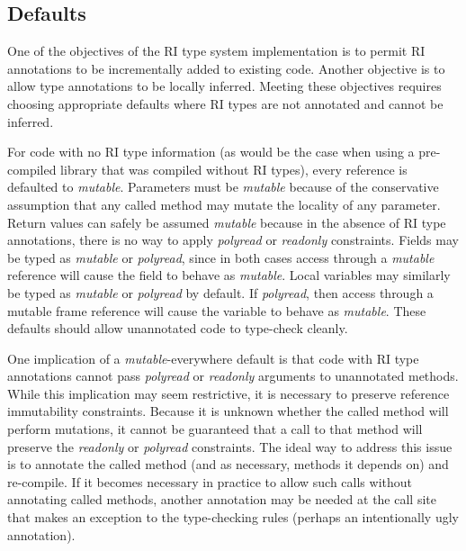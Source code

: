 \documentclass[letterpaper,11pt]{article}
\theoremstyle{definition}
\theoremstyle{remark}
\begin{document}

\subsection{Defaults}
\label{ri_type_defaults}

One of the objectives of the RI type system implementation is to permit
RI annotations to be incrementally added to existing code.
Another objective is to allow type annotations to be locally inferred.
Meeting these objectives requires choosing appropriate defaults
where RI types are not annotated and cannot be inferred.

For code with no RI type information (as would be the case when using a
pre-compiled library that was compiled without RI types),
every reference is defaulted to \emph{mutable}.
Parameters must be \emph{mutable} because of the conservative assumption that any called
method may mutate the locality of any parameter.
Return values can safely be assumed \emph{mutable} because in the absence of RI type annotations,
there is no way to apply \emph{polyread} or \emph{readonly} constraints.
Fields may be typed as \emph{mutable} or \emph{polyread}, since in both cases
access through a \emph{mutable} reference will cause the field to behave as \emph{mutable}.
Local variables may similarly be typed as \emph{mutable} or \emph{polyread} by default.
If \emph{polyread}, then access through a mutable frame reference %
will cause the variable to behave as \emph{mutable}.
These defaults should allow unannotated code to type-check cleanly.

One implication of a \emph{mutable}-everywhere default is that code with
RI type annotations cannot pass \emph{polyread} or \emph{readonly} arguments
to unannotated methods.
While this implication may seem restrictive, it is necessary to
preserve reference immutability constraints.
Because it is unknown whether the called method will perform mutations,
it cannot be guaranteed that a call to that method will preserve the
\emph{readonly} or \emph{polyread} constraints.
The ideal way to address this issue is to annotate the called method
(and as necessary, methods it depends on) and re-compile.
If it becomes necessary in practice to allow such calls without
annotating called methods, another annotation may be needed at the call site
that makes an exception to the type-checking rules (perhaps an intentionally ugly annotation).
\end{document}
